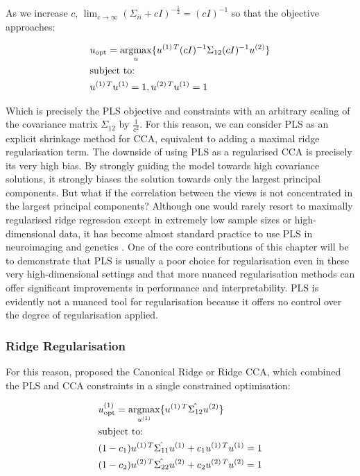 As we increase $c$, $\lim_{c \to \infty} (\Sigma_{ii}+ c I)^{-\frac{1}{2}}= (c I)^{-1}$ so that the objective approaches:

\begin{align}
    & u_{\text{opt}}=\underset{u}{\mathrm{argmax}}\{ u^{(1)\,T}(c I)^{-1}\Sigma_{12}(c I)^{-1}u^{(2)} \} \\
    & \text{subject to:} \notag \\
    & u^{(1)\,T}u^{(1)}=1, u^{(2)\,T}u^{(1)}=1 \notag
\end{align}

Which is precisely the PLS objective and constraints with an arbitrary scaling of the covariance matrix $\Sigma_{12}$ by $\frac{1}{c^2}$.
For this reason, we can consider PLS as an explicit shrinkage method for CCA, equivalent to adding a maximal ridge regularisation term.
The downside of using PLS as a regularised CCA is precisely its very high bias.
By strongly guiding the model towards high covariance solutions, it strongly biases the solution towards only the largest principal components.
But what if the correlation between the views is not concentrated in the largest principal components?
Although one would rarely resort to maximally regularised ridge regression except in extremely low sample sizes or high-dimensional data, it has become almost standard practice to use PLS in neuroimaging and genetics \citep{cruciani2022pls, krishnan2011partial}.
One of the core contributions of this chapter will be to demonstrate that PLS is usually a poor choice for regularisation even in these very high-dimensional settings and that more nuanced regularisation methods can offer significant improvements in performance and interpretability.
PLS is evidently not a nuanced tool for regularisation because it offers no control over the degree of regularisation applied.

\subsubsection{Ridge Regularisation} For this reason, \citet{vinod1976canonical} proposed the Canonical Ridge or Ridge CCA, which combined the PLS and CCA constraints in a single constrained optimisation:

\begin{align}
    & u^{(1)}_{\text{opt}} = \underset{u^{(1)}}{\mathrm{argmax}} \{ u^{(1)\,T} \hat{\Sigma_{12}} u^{(2)} \} \\
    & \text{subject to:} \notag \\
    & (1 - c_1) u^{(1)\,T} \hat{\Sigma_{11}} u^{(1)} + c_1 u^{(1)\,T} u^{(1)} = 1 \notag \\
    & (1 - c_2) u^{(2)\,T} \hat{\Sigma_{22}} u^{(2)} + c_2 u^{(2)\,T} u^{(2)} = 1 \notag
\end{align}

